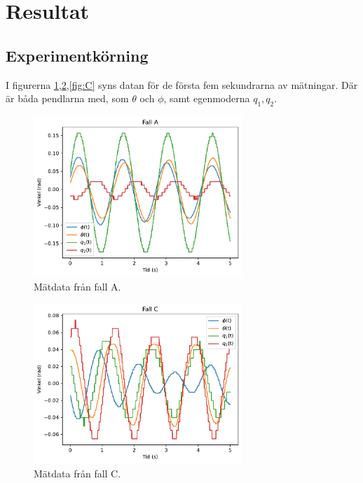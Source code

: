 \section{Resultat}

\subsection{Experimentkörning}
I figurerna \ref{fig:A},\ref{fig:B},\ref{fig:C} syns datan för de första fem sekundrarna av mätningar. Där är båda pendlarna med, som $\theta$ och $\phi$, samt egenmoderna $q_1,q_2$.

\begin{figure}[htbp]
    \centering
    \includegraphics[width=0.7\textwidth]{plot_A.pdf}
    \caption{Mätdata från fall A.}
    \label{fig:A}
\end{figure}

\begin{figure}[htbp]
    \centering
    \includegraphics[width=0.7\textwidth]{plot_C.pdf}
    \caption{Mätdata från fall C.}
    \label{fig:B}
\end{figure}


